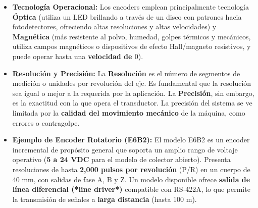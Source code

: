 \begin{itemize}
    \item \textbf{Tecnología Operacional:} Los encoders emplean principalmente tecnología \textbf{Óptica} (utiliza un LED brillando a través de un disco con patrones hacia fotodetectores, ofreciendo altas resoluciones y altas velocidades) y \textbf{Magnética} (más resistente al polvo, humedad, golpes térmicos y mecánicos, utiliza campos magnéticos o dispositivos de efecto Hall/magneto resistivos, y puede operar hasta una \textbf{velocidad de $0$}).

    \item \textbf{Resolución y Precisión:}
    La \textbf{Resolución} es el número de segmentos de medición o unidades por revolución del eje. Es fundamental que la resolución sea igual o mejor a la requerida por la aplicación. La \textbf{Precisión}, sin embargo, es la exactitud con la que opera el transductor. La precisión del sistema se ve limitada por la \textbf{calidad del movimiento mecánico} de la máquina, como errores o contragolpe.

    \item \textbf{Ejemplo de Encoder Rotatorio (E6B2):} El modelo E6B2 es un encoder incremental de propósito general que soporta un amplio rango de voltaje operativo (\textbf{5 a 24 VDC} para el modelo de colector abierto). Presenta resoluciones de hasta \textbf{2,000 pulsos por revolución} (P/R) en un cuerpo de 40 mm, con salidas de fase A, B y Z. Un modelo disponible ofrece \textbf{salida de línea diferencial (*line driver*)} compatible con RS-422A, lo que permite la transmisión de señales a \textbf{larga distancia} (hasta 100 m).
\end{itemize}

